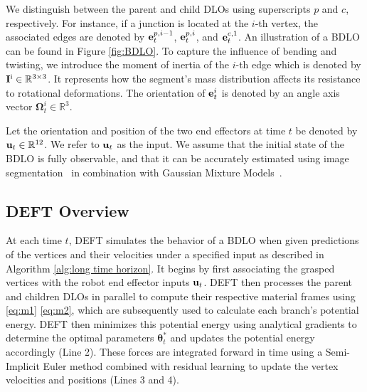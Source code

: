 We distinguish between the parent and child DLOs using superscripts $p$ and $c$, respectively. 
For instance, if a junction is located at the $i$-th vertex, the associated edges are denoted by $\mathbf{e}^{p, i-1}_{t}$, $\mathbf{e}^{p, i}_{t}$, and $\mathbf{e}^{c, 1}_{t}$. 
An illustration of a BDLO can be found in Figure \ref{fig:BDLO}.
To capture the influence of bending and twisting, we introduce the moment of inertia of the $i$-th edge  which is denoted by $\mathbf{I}^\text{i}\in \mathbb{R}^{3\times3}$.
It represents how the segment’s mass distribution affects its resistance to rotational deformations.
The orientation of $\mathbf{e}^{i}_{t}$ is denoted by an angle axis vector  $\mathbf{\Omega}^i_t\in \mathbb{R}^{3}$.

Let the orientation and position of the two end effectors at time $t$ be denoted by $\mathbf{u}_t \in \mathbb{R}^{12}$.
We refer to $\mathbf{u}_t$ as the input.
We assume that the initial state of the BDLO is fully observable, and that it can be accurately estimated using image segmentation~\cite{SAM} in combination with Gaussian Mixture Models~\cite{BDLO_perception}.


\subsection{DEFT Overview}

At each time $t$, DEFT simulates the behavior of a BDLO when given predictions of the vertices and their velocities under a specified input as described in Algorithm \ref{alg:long time horizon}. 
It begins by first associating the grasped vertices with the robot end effector inputs  $\mathbf{u}_t$.
DEFT then processes the parent and children DLOs in parallel to compute their respective material frames using \eqref{eq:m1} \eqref{eq:m2}, which are subsequently used to calculate each branch’s potential energy.
DEFT then minimizes this potential energy using analytical gradients to determine the optimal parameters $\bm{\theta}_t^*$ and updates the potential energy accordingly (Line 2). 
These forces are integrated forward in time using a Semi-Implicit Euler method combined with residual learning to update the vertex velocities and positions (Lines 3 and 4). 


